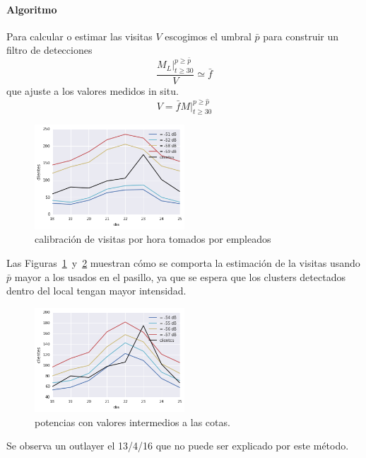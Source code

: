 \paragraph{Algoritmo}
Para calcular o estimar las visitas $V$
escogimos el umbral $\bar{p}$ para construir un filtro de detecciones
\[
\frac{M_L \Big|_{t\ge 30}^{p \ge \bar{p}}}{V} \simeq \bar{f}
\]
que ajuste a los valores medidos in situ.
\[
V = \bar{f} M \Big|_{t \ge 30}^{p \ge \hat{p}}
\]


\begin{figure}[H] 
  \centering
  \includegraphics[width=0.5\textwidth]{cotas_sup_inf_valores_diarios_pot_conteos.png}
  \caption{
    calibración de visitas por hora tomados por empleados
  }
  \label{fig:mediciones_cotas}
\end{figure}

Las Figuras~\ref{fig:mediciones_cotas}~y~\ref{fig:mediciones_intermedios} muestran cómo se comporta la estimación de la visitas usando $\bar{p}$ mayor a los usados en el pasillo, ya que se espera que los clusters detectados dentro del local tengan mayor intensidad.  

\begin{figure}[H] 
  \centering
  \includegraphics[width=0.5\textwidth]{pot_que_no_estiman_correctamente_los_conteos.png}
  \caption{
    potencias con valores intermedios a las cotas. 
  }
  \label{fig:mediciones_intermedios}
\end{figure}
Se observa un outlayer el 13/4/16 que no puede ser explicado por este método.

